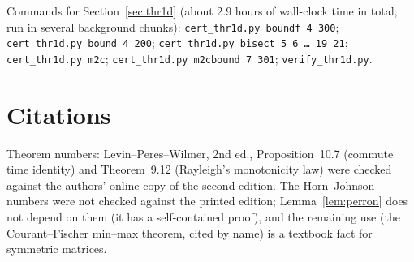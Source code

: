 \documentclass[11pt,a4paper]{article}
\theoremstyle{definition}
\begin{document}
\medskip
Commands for Section~\ref{sec:thr1d} (about 2.9 hours of wall-clock time in total, run in several background chunks): \texttt{cert\_thr1d.py boundf 4 300}; \texttt{cert\_thr1d.py bound 4 200}; \texttt{cert\_thr1d.py bisect 5 6 \dots\ 19 21}; \texttt{cert\_thr1d.py m2c}; \texttt{cert\_thr1d.py m2cbound 7 301}; \texttt{verify\_thr1d.py}.

\section{Citations}\label{app:citations}

Theorem numbers: Levin--Peres--Wilmer, 2nd ed., Proposition~10.7 (commute time identity) and Theorem~9.12 (Rayleigh's monotonicity law) were checked against the authors' online copy of the second edition. The Horn--Johnson numbers were not checked against the printed edition; Lemma~\ref{lem:perron} does not depend on them (it has a self-contained proof), and the remaining use (the Courant--Fischer min--max theorem, cited by name) is a textbook fact for symmetric matrices.
\end{document}

